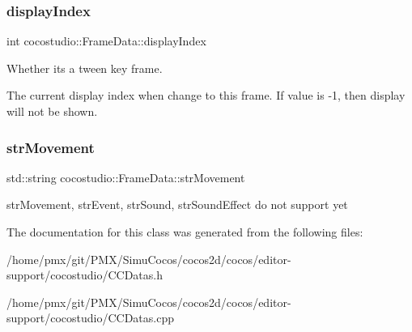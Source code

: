 \subsubsection{\texorpdfstring{display\+Index}{displayIndex}}
{\footnotesize\ttfamily int cocostudio\+::\+Frame\+Data\+::display\+Index}



Whether it\textquotesingle{}s a tween key frame. 

The current display index when change to this frame. If value is -\/1, then display will not be shown. \mbox{\label{classcocostudio_1_1FrameData_ac6222bebecd83e9b9a483375d2df0cb8}} 
\subsubsection{\texorpdfstring{str\+Movement}{strMovement}}
{\footnotesize\ttfamily std\+::string cocostudio\+::\+Frame\+Data\+::str\+Movement}

str\+Movement, str\+Event, str\+Sound, str\+Sound\+Effect do not support yet 

The documentation for this class was generated from the following files\+:\begin{DoxyCompactItemize}
\item 
/home/pmx/git/\+P\+M\+X/\+Simu\+Cocos/cocos2d/cocos/editor-\/support/cocostudio/C\+C\+Datas.\+h\item 
/home/pmx/git/\+P\+M\+X/\+Simu\+Cocos/cocos2d/cocos/editor-\/support/cocostudio/C\+C\+Datas.\+cpp\end{DoxyCompactItemize}
